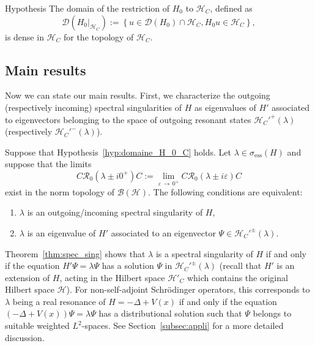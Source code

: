\documentclass[AHL,Unicode,longabstracts,published]{cedram}
\newcommand{\Hi}{\mathcal{H}}
\newcommand{\ess}{\mathrm{ess}}
\newcommand{\Res}{\mathcal{R}}
\newcommand{\clB}{\mathcal{B}}
\newcommand{\clD}{\mathcal{D}}
\newcommand*{\romanenumi}{\renewcommand*{\theenumi}{\roman{enumi}}}
\newcommand{\Hi}{\mathcal{H}}
\newcommand{\ess}{\mathrm{ess}}
\begin{document}
\begin{enonce}
{Hypothesis}\label{hyp:domaine_H_0_C}
The domain of the restriction of $H_0$ to $\Hi_C$, defined as
\begin{equation*}
\clD({H_0}|_{\Hi_C}):=\left\lbrace u\in\clD(H_0)\cap\Hi_C, H_0u\in\Hi_C\right\rbrace,
\end{equation*}
is dense in $\Hi_C$ for the topology of $\Hi_C$.
\end{enonce}



\subsection{Main results}


Now we can state our main results. First, we characterize the outgoing (respectively incoming) spectral singularities of $H$ as eigenvalues of $H'$ associated to eigenvectors belonging to the space of outgoing resonant states $\Hi_C'^+(\lambda)$ (respectively $\Hi_C'^-(\lambda)$).

\begin{theo}\label{thm:spec_sing}
Suppose that Hypothesis~\ref{hyp:domaine_H_0_C} holds. Let $\lambda\in \sigma_\ess(H)$ and suppose that the limits
\begin{equation*}
C\Res_0(\lambda \pm i0^+)C:=\lim_{\varepsilon\,\rightarrow\,0^+}C\Res_0(\lambda \pm i\varepsilon)C
\end{equation*}
exist in the norm topology of $\clB(\Hi)$. The following conditions are equivalent:
\begin{enumerate}\romanenumi
\item\label{it:spec_sing}
$\lambda$ is an outgoing/incoming spectral singularity of $H$,
\item\label{it:res_state}
$\lambda$ is an eigenvalue of $H'$ associated to an eigenvector $\Psi\in\Hi_C'^\pm(\lambda)$.
\end{enumerate}
\end{theo}

Theorem~\ref{thm:spec_sing} shows that $\lambda$ is a spectral singularity of $H$ if and only if the equation $H'\Psi=\lambda\Psi$ has a solution $\Psi$ in $\Hi_C'^\pm(\lambda)$ (recall that $H'$ is an extension of $H$, acting in the Hilbert space $\Hi'_C$ which contains the original Hilbert space $\Hi$). For non-self-adjoint Schr\"odinger operators, this corresponds to $\lambda$ being a real resonance of $H=-\Delta+V(x)$ if and only if the equation $(-\Delta+V(x))\Psi=\lambda\Psi$ has a distributional solution such that $\Psi$ belongs to suitable weighted $L^2$-spaces. See Section~\ref{subsec:appli} for a more detailed discussion.
\end{document}
